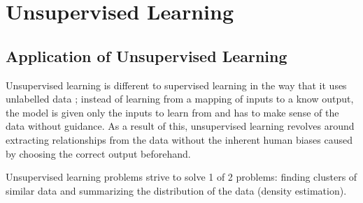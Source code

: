 \documentclass[10pt,a4paper]{report}
\begin{document}
	\chapter{Unsupervised Learning}

			\section{Application of Unsupervised Learning}
			Unsupervised learning is different to supervised learning in the way that it uses unlabelled data \autocite[p. 105]{DeepLearning}; instead
			of learning from a mapping of inputs to a know output, the model is given only the inputs to learn from and has to make sense of the data without guidance.
			As a result of this, unsupervised learning revolves around extracting relationships from the data without the inherent human biases caused by choosing the correct output beforehand. \par
			Unsupervised learning problems strive to solve 1 of 2 problems: finding clusters of similar data and summarizing the distribution of the data
			(density estimation).
\end{document}
